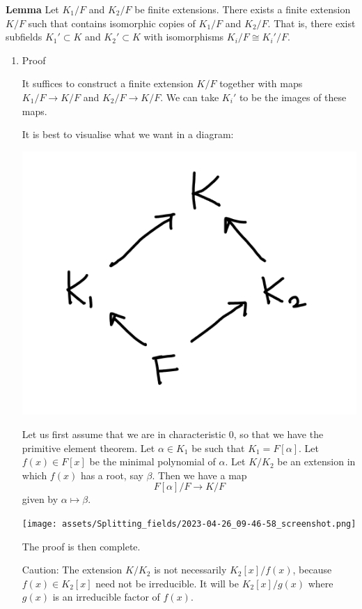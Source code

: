 \documentclass[11pt]{article}
\begin{document}
\textbf{Lemma} Let \(K_1/F\) and \(K_2/F\) be finite extensions.
There exists a finite extension \(K/F\) such that contains isomorphic copies of \(K_1/F\) and \(K_2/F\).
That is, there exist subfields \(K_{1}' \subset K\) and \(K_2' \subset K\) with isomorphisms \(K_{i}/F \cong K_{i}'/F\).
\begin{enumerate}
\item Proof
\label{sec:org98bf915}

It suffices to construct a finite extension \(K/F\) together with maps \(K_1/F \to K/F\) and \(K_2/F \to K/F\).  We can take \(K_i'\) to be the images of these maps.

It is best to visualise what we want in a diagram:
\begin{center}
\includegraphics[width=.9\linewidth]{assets/Course_notes/2023-04-24_11-50-13_screenshot.png}
\end{center}

Let us first assume that we are in characteristic 0, so that we have the primitive element theorem.
Let \(\alpha \in K_1\) be such that \(K_1 = F[\alpha]\).
Let \(f(x) \in F[x]\) be the minimal polynomial of \(\alpha\).
Let \(K/K_2\) be an extension in which \(f(x)\) has a root, say \(\beta\).
Then we have a map
\[ F[\alpha]/F \to K/F\]
given by \(\alpha \mapsto \beta\).

\begin{center}
\texttt{[image: assets/Splitting\_fields/2023-04-26\_09-46-58\_screenshot.png]}
\end{center}
The proof is then complete.

Caution: The extension \(K/K_2\) is not necessarily \(K_2[x]/f(x)\), because \(f(x) \in K_2[x]\) need not be irreducible.  It will be \(K_2[x]/g(x)\) where \(g(x)\) is an irreducible factor of \(f(x)\).  


\end{enumerate}
\end{document}
